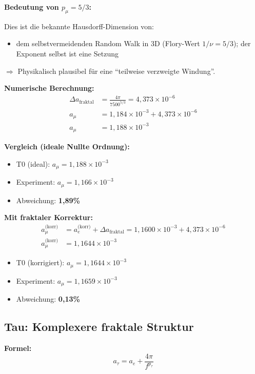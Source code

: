 	\textbf{Bedeutung von $p_\mu = 5/3$:}
	
	Dies ist die bekannte Hausdorff-Dimension von:
	\begin{itemize}
		\item dem selbstvermeidenden Random Walk in 3D (Flory-Wert $1/\nu = 5/3$); der Exponent selbst ist eine Setzung
	\end{itemize}
	
	$\Rightarrow$ Physikalisch plausibel für eine ``teilweise verzweigte Windung''.
	
	\textbf{Numerische Berechnung:}
	\begin{align}
		\Delta a_{\text{fraktal}} &= \frac{4\pi}{7500^{5/3}} = 4{,}373 \times 10^{-6} \\
		a_\mu &= 1{,}184 \times 10^{-3} + 4{,}373 \times 10^{-6} \\
		a_\mu &= 1{,}188 \times 10^{-3}
	\end{align}
	
	\textbf{Vergleich (ideale Nullte Ordnung):}
	\begin{itemize}
		\item T0 (ideal): $a_\mu = 1{,}188 \times 10^{-3}$
		\item Experiment: $a_\mu = 1{,}166 \times 10^{-3}$
		\item Abweichung: \textbf{1{,}89\%}
	\end{itemize}
	
	\textbf{Mit fraktaler Korrektur:}
	\begin{align}
		a_\mu^\text{(korr)} &= a_e^\text{(korr)} + \Delta a_\text{fraktal} = 1{,}1600 \times 10^{-3} + 4{,}373 \times 10^{-6} \\
		a_\mu^\text{(korr)} &= 1{,}1644 \times 10^{-3}
	\end{align}
	\begin{itemize}
		\item T0 (korrigiert): $a_\mu = 1{,}1644 \times 10^{-3}$
		\item Experiment: $a_\mu = 1{,}1659 \times 10^{-3}$
		\item Abweichung: \textbf{0{,}13\%}
	\end{itemize}
	
	\subsection{Tau: Komplexere fraktale Struktur}
	
	\textbf{Formel:}
	\begin{equation}
		a_\tau = a_e + \frac{4\pi}{f^{p_\tau}}
		\label{eq:atau}
	\end{equation}
	
